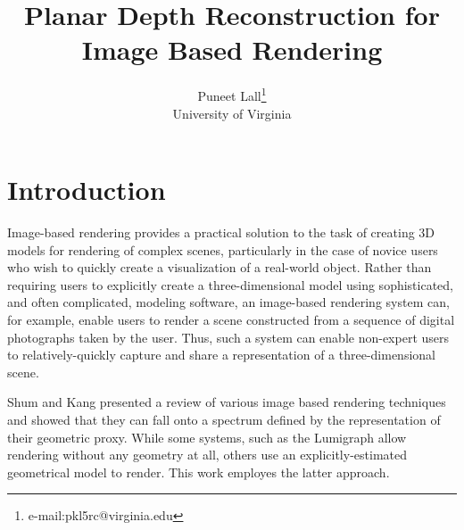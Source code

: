 \documentclass[conference]{acmsiggraph}
\title{Planar Depth Reconstruction for Image Based Rendering}
\author{Puneet Lall\thanks{e-mail:pkl5rc@virginia.edu}\\University of Virginia}
\begin{document}

\maketitle










\section{Introduction}

Image-based rendering provides a practical solution to the task of creating
3D models for rendering of complex scenes, particularly in the case of
novice users who wish to quickly create a visualization of a real-world object.
Rather than requiring users to explicitly create a three-dimensional model using
sophisticated, and often complicated, modeling software, an image-based rendering
system can, for example, 
enable users to render a scene constructed from a sequence of
digital photographs taken by the user.  Thus, such a system can enable
non-expert users to relatively-quickly capture and share a representation of
a three-dimensional scene.
 
Shum and Kang  presented a review of various image based
rendering techniques and showed that they can fall onto a spectrum defined
by the representation of their geometric proxy.  While some systems,
such as the Lumigraph \cite{gortler1996lumigraph} allow rendering without
any geometry at all, others use an explicitly-estimated geometrical model
to render.  This work employes the latter approach.
\end{document}
